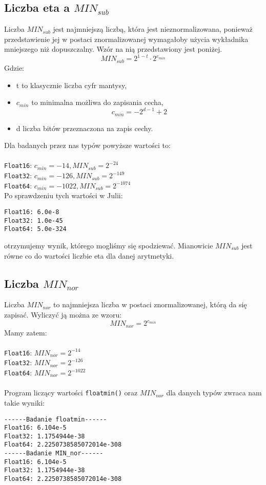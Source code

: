 \documentclass{article}
\begin{document}
\subsection{Liczba eta a $MIN_{sub}$}
Liczba $MIN_{sub}$ jest najmniejszą liczbą, która jest nieznormalizowana, ponieważ przedstawienie jej w postaci znormalizowanej wymagałoby użycia wykładnika mniejszego niż dopuszczalny. Wzór na nią przedstawiony jest poniżej.\\
\[
MIN_{sub} = 2^{1-t} \cdot 2^{c_{min}}
\]
Gdzie:
\begin{itemize}
\item t to klasycznie liczba cyfr mantysy,
\item $c_{min}$ to minimalna możliwa do zapisania cecha, 
\[
c_{min} = -2^{d-1} + 2
\]
\item d liczba bitów przeznaczona na zapis cechy.
\end{itemize}

\noindent Dla badanych przez nas typów powyższe wartości to:\\\\
\texttt{Float16}: $c_{min} = -14, MIN_{sub} = 2^{-24}$\\
\texttt{Float32}: $c_{min} = -126, MIN_{sub} = 2^{-149}$\\
\texttt{Float64}: $c_{min} = -1022, MIN_{sub} = 2^{-1074}$\\

\noindent Po sprawdzeniu tych wartości w Julii:\\
\begin{verbatim}
Float16: 6.0e-8
Float32: 1.0e-45
Float64: 5.0e-324
\end{verbatim}
otrzymujemy wynik, którego mogliśmy się spodziewać. Mianowicie $MIN_{sub}$ jest równe co do wartości liczbie eta dla danej arytmetyki.\\

\subsection{Liczba $MIN_{nor}$}
Liczba $MIN_{nor}$ to najmniejsza liczba w postaci znormalizowanej, którą da się zapisać. Wyliczyć ją można ze wzoru:\\
\[
MIN_{nor} = 2^{c_{min}}
\]
Mamy zatem:\\\\
\texttt{Float16}: $MIN_{nor} = 2^{-14}$\\
\texttt{Float32}: $MIN_{nor} = 2^{-126}$\\
\texttt{Float64}: $MIN_{nor} = 2^{-1022}$\\\\
Program liczący wartości \texttt{floatmin()} oraz $MIN_{nor}$ dla danych typów zwraca nam takie wyniki:\\
\begin{verbatim}
------Badanie floatmin------
Float16: 6.104e-5
Float32: 1.1754944e-38
Float64: 2.2250738585072014e-308
------Badanie MIN_nor------
Float16: 6.104e-5
Float32: 1.1754944e-38
Float64: 2.2250738585072014e-308
\end{verbatim}
\end{document}
